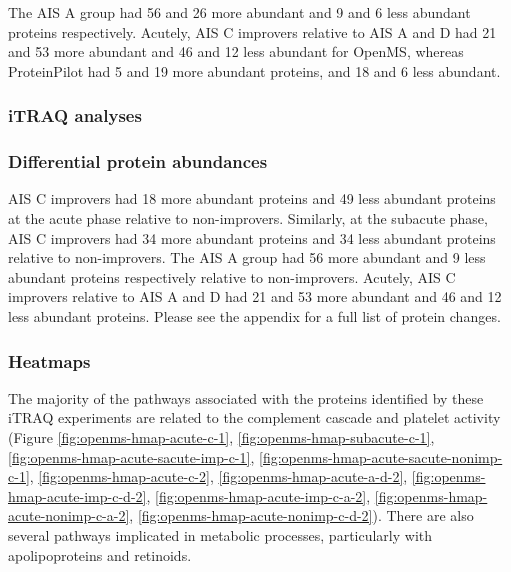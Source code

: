 \documentclass[9pt,lineno]{elife}
\begin{document}
The AIS A group had 56 and 26 more abundant and 9 and 6 less abundant proteins respectively.
Acutely, AIS C improvers relative to AIS A and D had 21 and 53 more abundant and 46 and 12 less abundant for OpenMS, whereas ProteinPilot had 5 and 19 more abundant proteins, and 18 and 6 less abundant.





\clearpage

\hypertarget{itraq-analyses}{%
\subsubsection{iTRAQ analyses}\label{itraq-analyses}}

\hypertarget{differential-protein-abundances}{%
\subsubsection{Differential protein abundances}\label{differential-protein-abundances}}

AIS C improvers had 18 more abundant proteins and 49 less abundant proteins at the acute phase relative to non-improvers.
Similarly, at the subacute phase, AIS C improvers had 34 more abundant proteins and 34 less abundant proteins relative to non-improvers.
The AIS A group had 56 more abundant and 9 less abundant proteins respectively relative to non-improvers.
Acutely, AIS C improvers relative to AIS A and D had 21 and 53 more abundant and 46 and 12 less abundant proteins.
Please see the appendix for a full list of protein changes.

\hypertarget{heatmaps-chap3}{%
\subsubsection{Heatmaps}\label{heatmaps-chap3}}

The majority of the pathways associated with the proteins identified by these iTRAQ experiments are related to the complement cascade and platelet activity (Figure \ref{fig:openms-hmap-acute-c-1}, \ref{fig:openms-hmap-subacute-c-1}, \ref{fig:openms-hmap-acute-sacute-imp-c-1}, \ref{fig:openms-hmap-acute-sacute-nonimp-c-1}, \ref{fig:openms-hmap-acute-c-2}, \ref{fig:openms-hmap-acute-a-d-2}, \ref{fig:openms-hmap-acute-imp-c-d-2}, \ref{fig:openms-hmap-acute-imp-c-a-2}, \ref{fig:openms-hmap-acute-nonimp-c-a-2}, \ref{fig:openms-hmap-acute-nonimp-c-d-2}).
There are also several pathways implicated in metabolic processes, particularly with apolipoproteins and retinoids.
\end{document}
